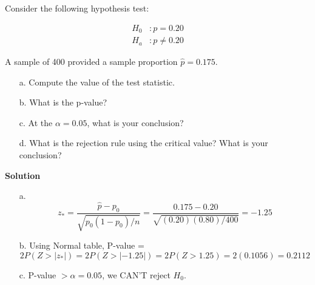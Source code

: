 \begin{example}
Consider the following hypothesis test:

\begin{align*}
H_0 &: p = 0.20 \\
H_a &: p \ne 0.20
\end{align*}

A sample of 400 provided a sample proportion $\hat{p} = 0.175$.

\begin{itemize}
  \item[a.] Compute the value of the test statistic.
  \item[b.] What is the p-value?
  \item[c.] At the $\alpha = 0.05$, what is your conclusion?
  \item[d.] What is the rejection rule using the critical value? What is your conclusion?
\end{itemize}

\vspace{1em}
\textbf{Solution}

\begin{itemize}
  \item[a.]
  \[
  z_* = \frac{\hat{p} - p_0}{\sqrt{p_0(1 - p_0)/n}} = \frac{0.175 - 0.20}{\sqrt{(0.20)(0.80)/400}} = -1.25
  \]
  
  \item[b.] Using Normal table, P-value =
  \[
  2P(Z > |z_*|) = 2P(Z > |-1.25|) = 2P(Z > 1.25) = 2(0.1056) = 0.2112
  \]
  
  \item[c.] P-value $> \alpha = 0.05$, we CAN'T reject $H_0$.
\end{itemize}
\end{example}
